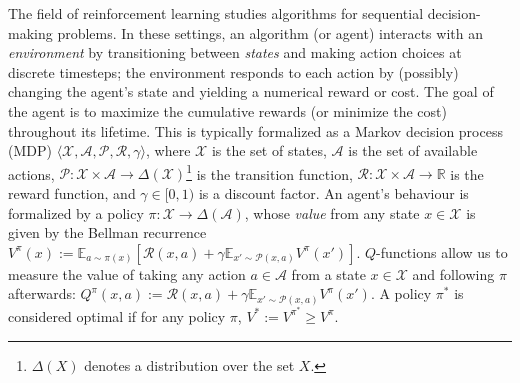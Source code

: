 \documentclass[10pt]{article} %
\begin{document}
The field of reinforcement learning studies algorithms for sequential decision-making problems. In these settings, an algorithm (or agent) interacts with an {\em environment} by transitioning between {\em states} and making action choices at discrete timesteps; the environment responds to each action by (possibly) changing the agent's state and yielding a numerical reward or cost. The goal of the agent is to maximize the cumulative rewards (or minimize the cost) throughout its lifetime.
This is typically formalized as a Markov decision process (MDP) \citep{puterman2014markov} $\langle \mathcal{X}, \mathcal{A}, \mathcal{P}, \mathcal{R}, \gamma \rangle$, where $\mathcal{X}$ is the set of states, $\mathcal{A}$ is the set of available actions, $\mathcal{P}:\mathcal{X}\times\mathcal{A}\rightarrow \Delta(\mathcal{X})$\footnote{$\Delta(X)$ denotes a distribution over the set $X$.} is the transition function, $\mathcal{R}:\mathcal{X}\times\mathcal{A}\rightarrow\mathbb{R}$ is the reward function, and $\gamma\in [0, 1)$ is a discount factor. An agent's behaviour is formalized by a policy $\pi:\mathcal{X}\rightarrow\Delta(\mathcal{A})$, whose {\em value} from any state $x\in\mathcal{X}$ is given by the Bellman recurrence 
$V^{\pi}(x) := \mathbb{E}_{a\sim\pi(x)}\left[\mathcal{R}(x, a) + \gamma \mathbb{E}_{x'\sim\mathcal{P}(x, a)}V^{\pi}(x')\right]$. $Q$-functions allow us to measure the value of taking any action $a\in\mathcal{A}$ from a state $x\in\mathcal{X}$ and following $\pi$ afterwards: $Q^{\pi}(x, a) := \mathcal{R}(x, a) + \gamma \mathbb{E}_{x'\sim\mathcal{P}(x, a)} V^{\pi}(x')$. %
A policy $\pi^*$ is considered optimal if for any policy $\pi$, $V^* := V^{\pi^*} \geq V^{\pi}$.
\end{document}
